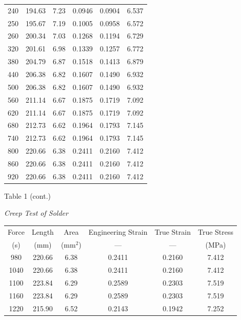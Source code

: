 \documentclass[12pt]{article}
\begin{document}
\begin{center}
\begin{tabular}{ c c c c c c}
240  & 194.63 & 7.23 & 0.0946 & 0.0904 & 6.537 \\
250  & 195.67 & 7.19 & 0.1005 & 0.0958 & 6.572 \\
260  & 200.34 & 7.03 & 0.1268 & 0.1194 & 6.729 \\
320  & 201.61 & 6.98 & 0.1339 & 0.1257 & 6.772 \\
380  & 204.79 & 6.87 & 0.1518 & 0.1413 & 6.879 \\
440  & 206.38 & 6.82 & 0.1607 & 0.1490 & 6.932 \\
500  & 206.38 & 6.82 & 0.1607 & 0.1490 & 6.932 \\
560  & 211.14 & 6.67 & 0.1875 & 0.1719 & 7.092 \\
620  & 211.14 & 6.67 & 0.1875 & 0.1719 & 7.092 \\
680  & 212.73 & 6.62 & 0.1964 & 0.1793 & 7.145 \\
740  & 212.73 & 6.62 & 0.1964 & 0.1793 & 7.145 \\
800  & 220.66 & 6.38 & 0.2411 & 0.2160 & 7.412 \\
860  & 220.66 & 6.38 & 0.2411 & 0.2160 & 7.412 \\
920  & 220.66 & 6.38 & 0.2411 & 0.2160 & 7.412 \\
\hline
\end{tabular}

\newpage

Table 1 (cont.) 


\emph{Creep Test of Solder} 


\begin{tabular}{ c c c c c c}
\hline
Force & Length & Area & Engineering Strain & True Strain & True Stress\\
(s) & (mm) & (mm$^2$) & --- & --- & (MPa)\\
\hline

980  & 220.66 & 6.38 & 0.2411 & 0.2160 & 7.412 \\
1040 & 220.66 & 6.38 & 0.2411 & 0.2160 & 7.412 \\
1100 & 223.84 & 6.29 & 0.2589 & 0.2303 & 7.519 \\
1160 & 223.84 & 6.29 & 0.2589 & 0.2303 & 7.519 \\
1220 & 215.90 & 6.52 & 0.2143 & 0.1942 & 7.252\\
\hline
\end{tabular}
\end{center}
\bigskip
\end{document}

